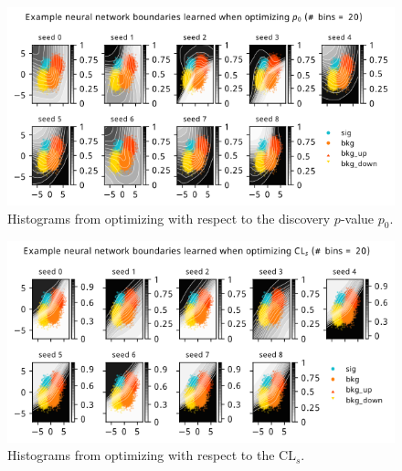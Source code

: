 \documentclass[
  11pt,
  numbers=noendperiod]{book}
\begin{document}
\begin{figure}

{\centering \includegraphics{./images/new-grid-models-discovery-20bin.png}

}

\caption{Histograms from optimizing with respect to the discovery
\(p\)-value \(p_0\).}

\end{figure}

\begin{figure}

{\centering \includegraphics{./images/new-grid-models-CLs-20bin.png}

}

\caption{Histograms from optimizing with respect to the
\(\mathrm{CL}_s\).}

\end{figure}
\end{document}
